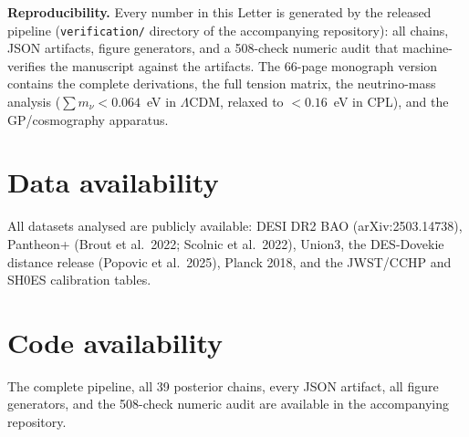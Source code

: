 \documentclass[11pt]{article}
\begin{document}
\textbf{Reproducibility.} Every number in this Letter is generated by the released pipeline (\texttt{verification/} directory of the accompanying repository): all chains, JSON artifacts, figure generators, and a 508-check numeric audit that machine-verifies the manuscript against the artifacts. The 66-page monograph version contains the complete derivations, the full tension matrix, the neutrino-mass analysis ($\sum m_\nu < 0.064$~eV in $\Lambda$CDM, relaxed to $< 0.16$~eV in CPL), and the GP/cosmography apparatus.

\section*{Data availability}

All datasets analysed are publicly available: DESI DR2 BAO (arXiv:2503.14738), Pantheon+ (Brout et al.~2022; Scolnic et al.~2022), Union3, the DES-Dovekie distance release (Popovic et al.~2025), Planck 2018, and the JWST/CCHP and SH0ES calibration tables.

\section*{Code availability}

The complete pipeline, all 39 posterior chains, every JSON artifact, all figure generators, and the 508-check numeric audit are available in the accompanying repository.
\end{document}
